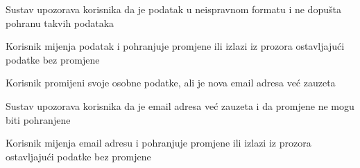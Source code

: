 \begin{packed_item}
\begin{packed_item}
\begin{packed_enum}
						\item Sustav upozorava korisnika da je podatak u neispravnom formatu i ne dopušta pohranu takvih podataka
						\item Korisnik mijenja podatak i pohranjuje promjene ili izlazi iz prozora ostavljajući podatke bez promjene
					\end{packed_enum}
					
						\item [6.b]  Korisnik promijeni svoje osobne podatke, ali je nova email adresa već zauzeta
					\item[] \begin{packed_enum}
						
						\item Sustav upozorava korisnika da je email adresa već zauzeta i da promjene ne mogu biti pohranjene
						\item Korisnik mijenja email adresu i pohranjuje promjene ili izlazi iz prozora ostavljajući podatke bez promjene
					\end{packed_enum}
				\end{packed_item}
			\end{packed_item}
		
